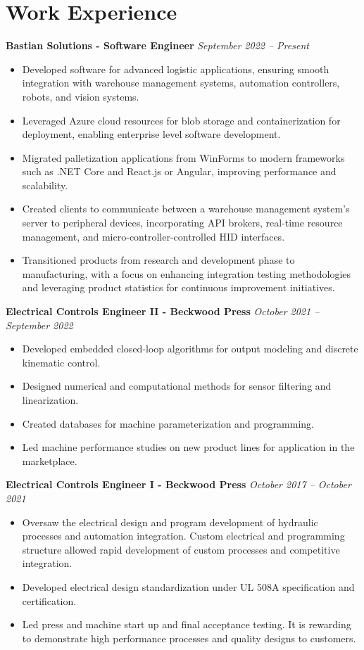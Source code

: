 \documentclass[letterpaper,10pt]{article} %
\newcommand{\job}[3]{
\textbf{#1 - #2} \hfill \textit{#3}
}
\begin{document}
\section{Work Experience}
\noindent\job{Bastian Solutions}{Software Engineer}{September 2022 -- Present}
\begin{itemize}[left=2em]
	\item Developed software for advanced logistic applications, ensuring smooth integration with warehouse management systems, automation controllers, robots, and vision systems.
	\item Leveraged Azure cloud resources for blob storage and containerization for deployment, enabling enterprise level software development.
	\item Migrated palletization applications from WinForms to modern frameworks such as .NET Core and React.js or Angular, improving performance and scalability.
	\item Created clients to communicate between a warehouse management system's server to peripheral devices, incorporating API brokers, real-time resource management, and micro-controller-controlled HID interfaces.
	\item Transitioned products from research and development phase to manufacturing, with a focus on enhancing integration testing methodologies and leveraging product statistics for continuous improvement initiatives.
\end{itemize}

\noindent\job{Electrical Controls Engineer II}{Beckwood Press}{October 2021 – September 2022}
\begin{itemize}[left=2em]
	\item Developed embedded closed-loop algorithms for output modeling and discrete kinematic control.
	\item Designed numerical and computational methods for sensor filtering and linearization.
	\item Created databases for machine parameterization and programming.
	\item Led machine performance studies on new product lines for application in the marketplace.
\end{itemize}

\noindent\job{Electrical Controls Engineer I}{Beckwood Press}{October 2017 – October 2021}
\begin{itemize}[left=2em]
	\item Oversaw the electrical design and program development of hydraulic processes and automation integration. Custom electrical and 	programming structure allowed rapid development of custom processes and competitive integration.
	\item Developed electrical design standardization under UL 508A specification and certification.
	\item Led press and machine start up and final acceptance testing. It is rewarding to demonstrate high performance processes
	and quality designs to customers.
\end{itemize}
	
\end{document}
